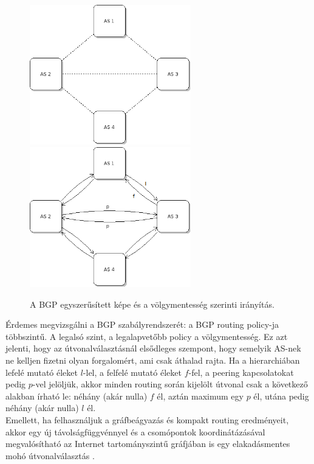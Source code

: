   \begin{figure}[!ht]
    \centering
    \includegraphics[width=70mm,keepaspectratio=true]{./figures/BGP_iranyitatlan.png}\hspace{5mm}
    \includegraphics[width=70mm,keepaspectratio=true]{./figures/BGP_iranyitott_labeled.png}

    \caption{A BGP egyszerűsített képe és a völgymentesség szerinti irányítás.}
    \label{fig:figure_BGP}
  \end{figure}

  Érdemes megvizsgálni a BGP szabályrendszerét: a BGP routing policy-ja többszintű. A legalsó szint, a legalapvetőbb policy a völgymentesség. Ez azt jelenti, hogy az útvonalválasztásnál elsődleges szempont, hogy semelyik AS-nek ne kelljen fizetni olyan forgalomért, ami csak áthalad rajta. Ha a hierarchiában lefelé mutató éleket $l$-lel, a felfelé mutató éleket $f$-fel, a peering kapcsolatokat pedig $p$-vel jelöljük, akkor minden routing során kijelölt útvonal csak a következő alakban írható le: néhány (akár nulla) $f$ él, aztán maximum egy $p$ él, utána pedig néhány (akár nulla) $l$ él.\\

  Emellett, ha felhasználjuk a gráfbeágyazás és kompakt routing eredményeit, akkor egy új távolságfüggvénnyel és a csomópontok koordinátázásával megvalósítható az Internet tartományszintű gráfjában is egy elakadásmentes mohó útvonalválasztás \cite{DobreiBScSzakdolgozat}.

